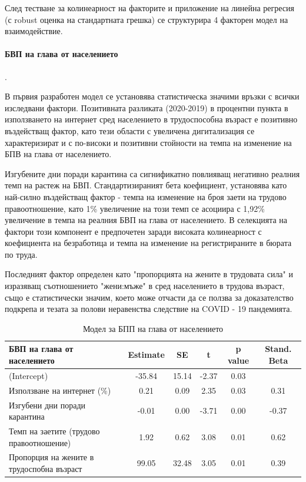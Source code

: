 \documentclass[a4paper,12pt]{article}
\begin{document}
След тестване за колинеарност на факторите и приложение на линейна регресия (с robust оценка на стандартната грешка) се структурира 4 факторен модел на взаимодействие. 

\paragraph{БВП на глава от населението}.

В първия разработен модел се установява статистическа значими връзки с всички изследвани фактори. Позитивната разликата (2020-2019) в процентни пункта в използването на интернет сред населението в трудоспособна възраст е позитивно въздействащ фактор, като тези области с увеличена дигитализация се характеризират и с по-високи и позитивни стойности на темпа на изменение на БПВ на глава от населението. 

Изгубените дни поради карантина са сигнификатно повлияващ негативно реалния темп на растеж на БВП. Стандартизираният бета коефициент, установява като най-силно въздействащ фактор - темпа на изменение на броя заети на трудово правоотношение, като 1\% увеличение на този темп се асоциира с 1,92\% увеличение в темпа на реалния БВП на глава от населението. В селекцията на фактори този компонент е предпочетен заради високата колинеарност с коефициента на безработица и темпа на изменение на регистрираните в бюрата по труда.

Последният фактор определен като "пропорцията на жените в трудовата сила" и изразяващ съотношението "жени:мъже" в сред населението в трудова възраст, също е статистически значим, което може отчасти да се ползва за доказателство подкрепа и тезата за полови неравенства следствие на COVID - 19 пандемията. \cite{NBERw26947}


\begin{table}[ht]
	\centering
	\caption{Модел за БПП на глава от населението}
	\begin{tabular}{lccccc}
		\toprule
		БВП на глава от населението  & Estimate & SE    & t     & p value & Stand. Beta \\
		\midrule
		(Intercept) & -35.84 & 15.14 & -2.37 & 0.03  &  \\
		Използване на интернет (\%) & 0.21  & 0.09  & 2.35  & 0.03  & 0.31 \\
		Изгубени дни поради карантина  & -0.01 & 0.00  & -3.71 & 0.00  & -0.37 \\
		Темп на заетите (трудово правоотношение) & 1.92  & 0.62  & 3.08  & 0.01  & 0.62 \\
		Пропорция на жените в трудоспобна възраст  & 99.05 & 32.48 & 3.05  & 0.01  & 0.39 \\
		\bottomrule
	\end{tabular}%
	\label{tab:addlabel}%
\end{table}%
\end{document}
